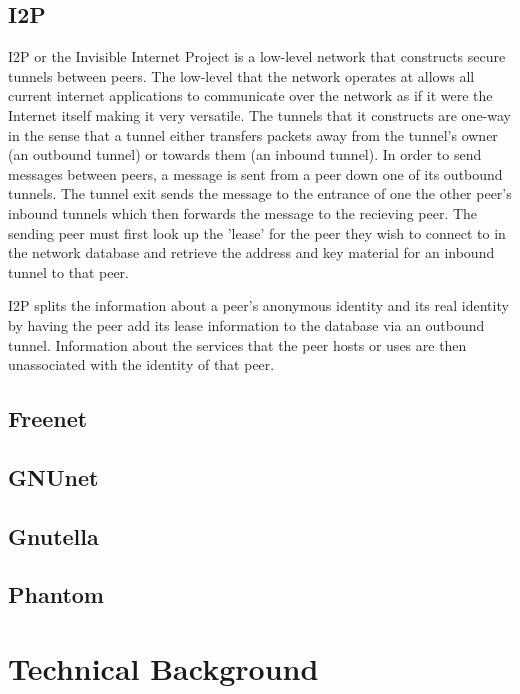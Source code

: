 \documentclass[ %
                    author={Luke Murray},
                supervisor={Dr. Simon Hollis},
                     title={Shadow Peer-to-Peer Networks},
                  subtitle={},
                    degree={MEng},
                      year={2013} ]{thesis}
\begin{document}
\section{I2P}

I2P\cite{I2P} or the Invisible Internet Project is a low-level network that constructs secure tunnels between peers. The low-level that the network operates at allows all current internet applications to communicate over the network as if it were the Internet itself making it very versatile. The tunnels that it constructs are one-way in the sense that a tunnel either transfers packets away from the tunnel's owner (an outbound tunnel) or towards them (an inbound tunnel). In order to send messages between peers, a message is sent from a peer down one of its outbound tunnels. The tunnel exit sends the message to the entrance of one the other peer's inbound tunnels which then forwards the message to the recieving peer. The sending peer must first look up the 'lease' for the peer they wish to connect to in the network database and retrieve the address and key material for an inbound tunnel to that peer.

I2P splits the information about a peer's anonymous identity and its real identity by having the peer add its lease information to the database via an outbound tunnel. Information about the services that the peer hosts or uses are then unassociated with the identity of that peer.

\section{Freenet}



\section{GNUnet}

\section{Gnutella}

\section{Phantom}



\chapter{Technical Background}
\label{chap:technical}
\end{document}
